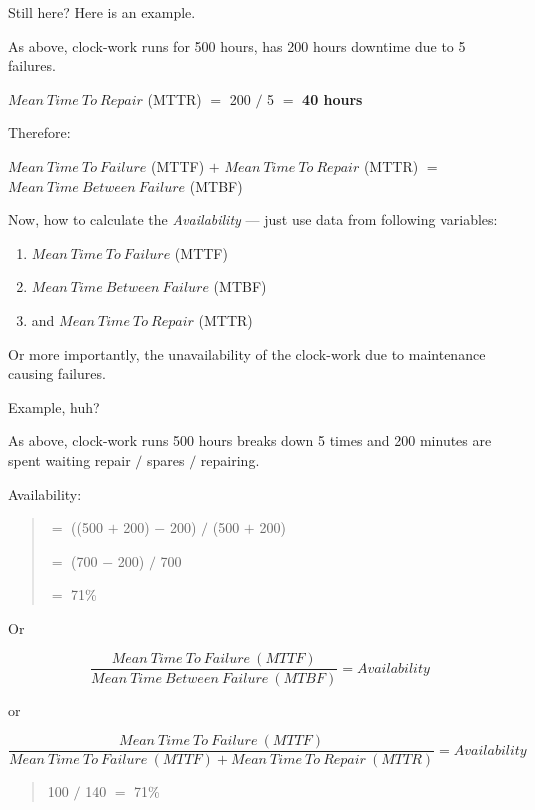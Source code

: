 Still here? Here is an example.

As above, clock-work runs for 500 hours, has 200 hours downtime due to 5 failures.

$Mean~Time~To~Repair$ (MTTR)  $=$  200  $/$  5  $=$  \textbf{40 hours}

Therefore: 

$Mean~Time~To~Failure$ (MTTF)  $+$  $Mean~Time~To~Repair$ (MTTR) $=$  $Mean~Time~Between~Failure$ (MTBF)

Now, how to calculate the \emph{Availability} — just use data from following variables:

\begin{enumerate}

 \item $Mean~Time~To~Failure$ (MTTF)
 \item $Mean~Time~Between~Failure$ (MTBF)
 \item and $Mean~Time~To~Repair$ (MTTR)
\end{enumerate}

Or more importantly, the unavailability of the clock-work due to maintenance causing failures.

Example, huh?

As above, clock-work runs 500 hours breaks down 5 times and 200 minutes are spent waiting repair $/$ spares $/$ repairing.

Availability:
\begin{quote}

 $=$  ((500 $+$ 200) $-$ 200) $/$ (500 $+$ 200)

 $=$  (700 $-$ 200) $/$ 700

 $=$  71\%
\end{quote}

Or

\begin{equation}\label{eq:Availability calculation}
\frac{Mean~Time~To~Failure~(MTTF)}
{Mean~Time~Between~Failure~(MTBF)} =  Availability
\end{equation}

or 


\begin{equation}\label{eq:Same Availability calculation}
\frac{Mean~Time~To~Failure~(MTTF)}
{Mean~Time~To~Failure~(MTTF)  +  Mean~Time~To~Repair~(MTTR)}  =  Availability
\end{equation}

\begin{quote}
100 $/$ 140  $=$  71\% 
\end{quote}

